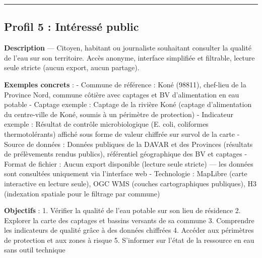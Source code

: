 \documentclass[
  paper=a4,
  oneside  ,captions=tableheading
]{scrartcl}
\begin{document}
\begin{center}\rule{0.5\linewidth}{0.5pt}\end{center}

\subsection{Profil 5 : Intéressé
public}\label{profil-5-intuxe9ressuxe9-public}

\textbf{Description} --- Citoyen, habitant ou journaliste souhaitant
consulter la qualité de l'eau sur son territoire. Accès anonyme,
interface simplifiée et filtrable, lecture seule stricte (aucun export,
aucun partage).

\textbf{Exemples concrets} : - Commune de référence : Koné (98811),
chef-lieu de la Province Nord, commune côtière avec captages et BV
d'alimentation en eau potable - Captage exemple : Captage de la rivière
Koné (captage d'alimentation du centre-ville de Koné, soumis à un
périmètre de protection) - Indicateur exemple : Résultat de contrôle
microbiologique (E. coli, coliformes thermotolérants) affiché sous forme
de valeur chiffrée sur survol de la carte - Source de données : Données
publiques de la DAVAR et des Provinces (résultats de prélèvements rendus
publics), référentiel géographique des BV et captages - Format de
fichier : Aucun export disponible (lecture seule stricte) --- les
données sont consultées uniquement via l'interface web - Technologie :
MapLibre (carte interactive en lecture seule), OGC WMS (couches
cartographiques publiques), H3 (indexation spatiale pour le filtrage par
commune)

\textbf{Objectifs} : 1. Vérifier la qualité de l'eau potable sur son
lieu de résidence 2. Explorer la carte des captages et bassins versants
de sa commune 3. Comprendre les indicateurs de qualité grâce à des
données chiffrées 4. Accéder aux périmètres de protection et aux zones à
risque 5. S'informer sur l'état de la ressource en eau sans outil
technique
\end{document}
